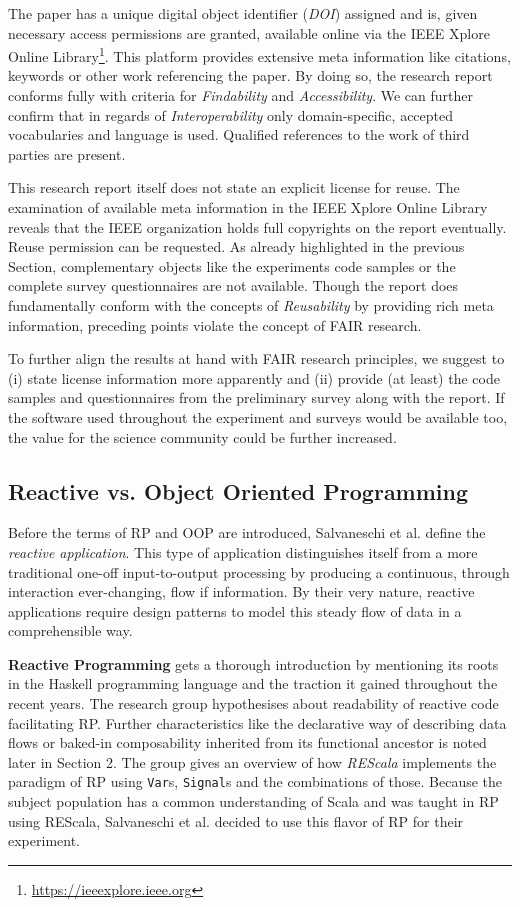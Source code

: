 \documentclass[12pt,a4paper]{article}
\begin{document}
The paper has a unique digital object identifier (\emph{DOI}) assigned and is, given necessary access permissions are granted, available online via the IEEE Xplore Online Library\footnote{\url{https://ieeexplore.ieee.org}}. This platform provides extensive meta information like citations, keywords or other work referencing the paper. By doing so, the research report conforms fully with criteria for \emph{Findability} and \emph{Accessibility}. We can further confirm that in regards of \emph{Interoperability} only domain-specific, accepted vocabularies and language is used. Qualified references to the work of third parties are present.

This research report itself does not state an explicit license for reuse. The examination of available meta information in the IEEE Xplore Online Library reveals that the IEEE organization holds full copyrights on the report eventually. Reuse permission can be requested. As already highlighted in the previous Section, complementary objects like the experiments code samples or the complete survey questionnaires are not available. Though the report does fundamentally conform with the concepts of \emph{Reusability} by providing rich meta information, preceding points violate the concept of FAIR research.

To further align the results at hand with FAIR research principles, we suggest to (i) state license information more apparently and (ii) provide (at least) the code samples and questionnaires from the preliminary survey along with the report. If the software used throughout the experiment and surveys would be available too, the value for the science community could be further increased.

\subsection{Reactive vs. Object Oriented Programming}

Before the terms of RP and OOP are introduced, Salvaneschi et al. define the \emph{reactive application}. This type of application distinguishes itself from a more traditional one-off input-to-output processing by producing a continuous, through interaction ever-changing, flow if information. By their very nature, reactive applications require design patterns to model this steady flow of data in a comprehensible way.

\textbf{Reactive Programming} gets a thorough introduction by mentioning its roots in the Haskell programming language and the traction it gained throughout the recent years. The research group hypothesises about readability of reactive code facilitating RP. Further characteristics like the declarative way of describing data flows or baked-in composability inherited from its functional ancestor is noted later in Section 2. The group gives an overview of how \emph{REScala} implements the paradigm of RP using \texttt{Var}s, \texttt{Signal}s and the combinations of those. Because the subject population has a common understanding of Scala and was taught in RP using REScala, Salvaneschi et al. decided to use this flavor of RP for their experiment.
\end{document}
